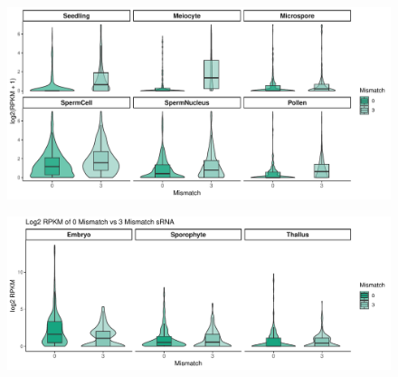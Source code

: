 \begin{figure}[htbp!] 
\centering    
    \includegraphics[width=1.7\textwidth]{Chapter3/Figs/Supps/0vs3_mismatch_Arabidopsis.pdf}
\caption{\textbf{}}
\label{fig:At_0v3}
\captionsetup{font=small}
    \caption*{}
\end{figure}

\begin{figure}[htbp!] 
\centering    
    \includegraphics[width=1.7\textwidth]{Chapter3/Figs/Supps/0v3_mismatch_Marchantia.pdf}
\caption{\textbf{}}
\label{fig:Mp_0v3}
\captionsetup{font=small}
    \caption*{}
\end{figure}


